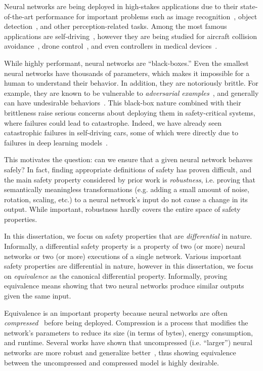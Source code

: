 Neural networks are being deployed in high-stakes applications due to their
state-of-the-art performance for important problems such as image
recognition~\cite{he2016deep}, object detection~\cite{redmon2016you}, and other
perception-related tasks. Among the most famous applications are
self-driving~\cite{grigorescu2020survey}, however they are being studied for
aircraft collision avoidance~\cite{JulianKO18}, drone control~\cite{caps2021}, and
even controllers in medical devices~\cite{tan2021toward}.

While highly performant, neural networks are ``black-boxes.'' Even the smallest neural
networks have thousands of parameters, which makes it impossible for a human to
understand their behavior. In addition, they are notoriously brittle. For
example, they are known to be vulnerable to \textit{adversarial
examples}~\cite{szegedy2013intriguing}, and generally can have undesirable
behaviors~\cite{KatzBDJK17}. This black-box nature combined with their brittleness
raise serious concerns about deploying them in safety-critical systems, where
failures could lead to catastrophe. Indeed, we have already seen catastrophic
failures in self-driving cars, some of which were directly due to failures in deep
learning models~\cite{phil_mccausland_2019}.

This motivates the question: can we ensure that a given neural network behaves
safely? In fact, finding appropriate definitions of safety has proven difficult,
and the main safety property considered by prior work is \textit{robustness},
i.e. proving that semantically meaningless transformations (e.g. adding a small
amount of noise, rotation, scaling, etc.) to a neural network's
input do not cause a change in its output. While important, robustness hardly
covers the entire space of safety properties.

In this dissertation, we focus on safety properties that are
\textit{differential} in nature. Informally, a differential safety property
is a property of two (or more) neural networks or two (or more) executions of a
single network. Various important safety
properties are differential in nature, however in this dissertation, we focus on
\textit{equivalence} as the canonical differential property. Informally,
proving equivalence means showing that two neural networks produce similar outputs given
the same input.

Equivalence is an important property because neural networks are often
\textit{compressed}~\cite{HanMD16} before being deployed. Compression is a
process that modifies the network's parameters to reduce its size (in terms of
bytes), energy consumption, and runtime. Several works have shown that
uncompressed (i.e. ``larger'') neural networks are more robust and generalize
better~\cite{bubeck2021universal,brutzkus2019larger}, thus showing equivalence
between the uncompressed and compressed model is highly desirable.

